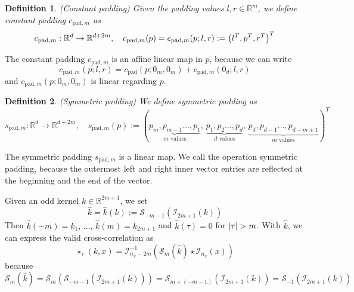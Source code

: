 \documentclass[twoside,a4paper]{article}
\newtheorem{definition}{Definition}
\begin{document}
\begin{definition}
	(Constant padding)
	Given the padding values $l,r \in \mathbb{R}^m$, we define constant padding 
	$c_{\text{pad},m}$ as
	\begin{equation*}
		c_{\text{pad},m} : \mathbb{R}^d \to \mathbb{R}^{d+2m},
		\quad c_{\text{pad},m}(p) = c_{\text{pad},m}(p;l,r) := \left( l^T, p^T, r^T \right)^T
	\end{equation*}
\end{definition}
The constant padding $c_{\text{pad},m}$ is an affine linear map in $p$, because we can write
\begin{equation}\label{cpad_affine}
	c_{\text{pad},m}(p;l,r) = c_{\text{pad}}(p;0_m,0_m)
	+ c_{\text{pad},m}(0_d;l,r)
\end{equation}
and $c_{\text{pad},m}(p;0_m,0_m)$ is linear regarding $p$.

\begin{definition}
	(Symmetric padding)
	We define symmetric padding as
	\begin{equation*}
		s_{\text{pad},m} : \mathbb{R}^d \to \mathbb{R}^{d+2m},
		\quad s_{\text{pad},m}(p) := (
			\underbrace{p_m, p_{m-1} \dots, p_1}_{m \text{ values}}, \,
			\underbrace{p_1, p_2 \dots, p_d}_{d \text{ values}}, \,
			\underbrace{p_d, p_{d-1} \dots, p_{d-m+1}}_{m \text{ values}}
		)^T
	\end{equation*}
\end{definition}
The symmetric padding $s_{\text{pad},m}$ is a linear map. We call the operation symmetric padding,
because the outermost left and right inner vector entries are reflected at the beginning and the end
of the vector.

Given an odd kernel $k \in \mathbb{R}^{2m+1}$, we set
\begin{equation*}
	\hat{k} = \hat{k}(k) := \mathcal{S}_{-m-1}(\mathcal{I}_{2m+1}(k))
\end{equation*}
Then $\hat{k}(-m) = k_1, \, \dots,\, \hat{k}(m) = k_{2m+1}$ and
$\hat{k}(\tau)=0$ for $\left|{\tau}\right| > m$. With $\hat{k}$, we can express the valid cross-correlation as
\begin{equation*}
	\star_{\text{v}}(k,x) = \mathcal{I}_{n_x-2m}^{-1} (
		\mathcal{S}_{m}(\hat{k}) \star \mathcal{I}_{n_x}(x)
	)
\end{equation*}
because
\begin{equation*}
	\mathcal{S}_{m}(\hat{k}) 
	= \mathcal{S}_{m}(\mathcal{S}_{-m-1}(\mathcal{I}_{2m+1}(k)))
	= \mathcal{S}_{m+(-m-1)}(\mathcal{I}_{2m+1}(k))
	= \mathcal{S}_{-1}(\mathcal{I}_{2m+1}(k))
\end{equation*}
\end{document}
